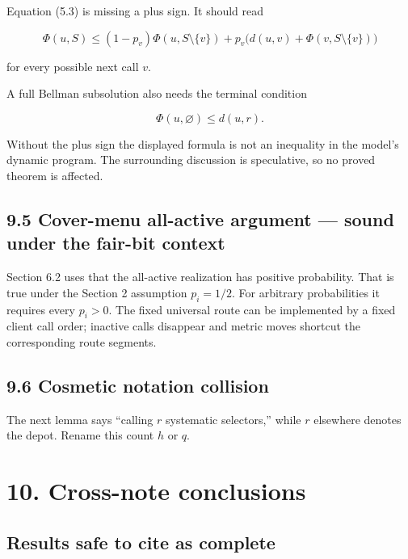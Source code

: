 \documentclass[11pt,a4paper]{article}
\begin{document}
Equation (5.3) is missing a plus sign.  It should read


\[
 \Phi(u,S)\le
 (1-p_v)\Phi(u,S\setminus\{v\})
 +p_v\bigl(d(u,v)+\Phi(v,S\setminus\{v\})\bigr)
\]

for every possible next call \(v\).


A full Bellman subsolution also needs the terminal condition


\[
 \Phi(u,\varnothing)\le d(u,r).
\]

Without the plus sign the displayed formula is not an inequality in the model's dynamic program.  The surrounding discussion is speculative, so no proved theorem is affected.


\subsection*{9.5 Cover-menu all-active argument — sound under the fair-bit context}

Section 6.2 uses that the all-active realization has positive probability. That is true under the Section 2 assumption \(p_i=1/2\).  For arbitrary probabilities it requires every \(p_i>0\).  The fixed universal route can be implemented by a fixed client call order; inactive calls disappear and metric moves shortcut the corresponding route segments.


\subsection*{9.6 Cosmetic notation collision}

The next lemma says “calling \(r\) systematic selectors,” while \(r\) elsewhere denotes the depot.  Rename this count \(h\) or \(q\).


\section*{10. Cross-note conclusions}

\subsection*{Results safe to cite as complete}
\end{document}
